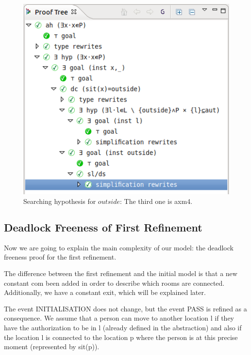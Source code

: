 \begin{figure}[!ht]
  \begin{center}
    \includegraphics{img/tutorial/tut_10_proof_tree_final.png}
    \caption{Searching hypothesis for $outside$: The third one is \textsf{axm4}.}
    \label{fig_tut_10_final_proof_tree}
  \end{center}
\end{figure}



\subsection{Deadlock Freeness of First Refinement}
\label{tut_location_first_refinement}

Now we are going to explain the main complexity of our model: the deadlock freeness proof for the first refinement. 


The difference between the first refinement and the initial model is that a new constant \textsf{com} been added in order to describe which rooms are connected. Additionally, we have a constant \textsf{exit}, which will be explained later. 

The event \textsf{INITIALISATION} does not change, but the event \textsf{PASS} is refined as a consequence. We assume that a person can move to another location l if they have the authorization to be in l (already defined in the abstraction) and also if the location l is connected to the location p where the person is at this precise moment (represented by sit(p)).

